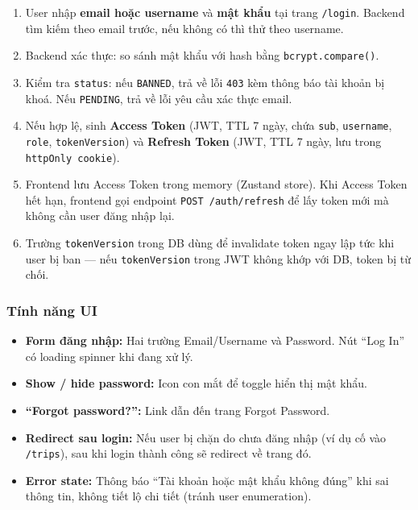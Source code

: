 \documentclass[12pt,a4paper]{article}
\begin{document}
\begin{enumerate}
  \item User nhập \textbf{email hoặc username} và \textbf{mật khẩu} tại trang
        \texttt{/login}. Backend tìm kiếm theo email trước, nếu không có thì
        thử theo username.
  \item Backend xác thực: so sánh mật khẩu với hash bằng
        \texttt{bcrypt.compare()}.
  \item Kiểm tra \texttt{status}: nếu \texttt{BANNED}, trả về lỗi
        \texttt{403} kèm thông báo tài khoản bị khoá. Nếu \texttt{PENDING},
        trả về lỗi yêu cầu xác thực email.
  \item Nếu hợp lệ, sinh \textbf{Access Token} (JWT, TTL 7 ngày, chứa
        \texttt{sub}, \texttt{username}, \texttt{role}, \texttt{tokenVersion})
        và \textbf{Refresh Token} (JWT, TTL 7 ngày, lưu trong
        \texttt{httpOnly cookie}).
  \item Frontend lưu Access Token trong memory (Zustand store). Khi Access
        Token hết hạn, frontend gọi endpoint \texttt{POST /auth/refresh} để
        lấy token mới mà không cần user đăng nhập lại.
  \item Trường \texttt{tokenVersion} trong DB dùng để invalidate token ngay
        lập tức khi user bị ban --- nếu \texttt{tokenVersion} trong JWT không
        khớp với DB, token bị từ chối.
\end{enumerate}

\subsubsection{Tính năng UI}

\begin{itemize}
  \item \textbf{Form đăng nhập:} Hai trường Email/Username và Password.
        Nút ``Log In'' có loading spinner khi đang xử lý.
  \item \textbf{Show / hide password:} Icon con mắt để toggle hiển thị
        mật khẩu.
  \item \textbf{``Forgot password?'':} Link dẫn đến trang Forgot Password.
  \item \textbf{Redirect sau login:} Nếu user bị chặn do chưa đăng nhập
        (ví dụ cố vào \texttt{/trips}), sau khi login thành công sẽ
        redirect về trang đó.
  \item \textbf{Error state:} Thông báo ``Tài khoản hoặc mật khẩu không
        đúng'' khi sai thông tin, không tiết lộ chi tiết (tránh user
        enumeration).
\end{itemize}
\end{document}
